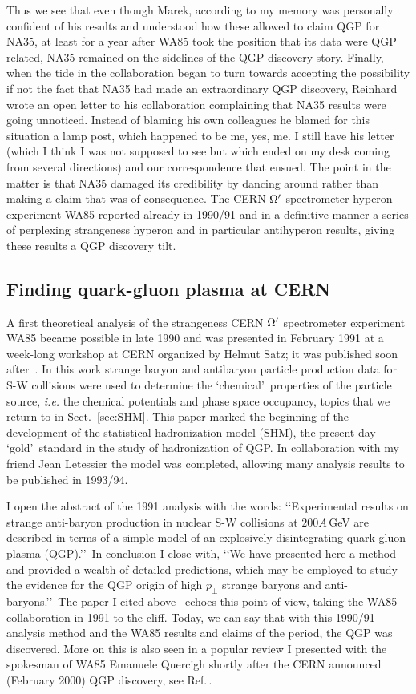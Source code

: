 \documentclass{appolb}
\begin{document}
Thus we see that even though Marek, according to my memory was personally confident of his results and understood how these allowed to claim QGP for NA35, at least for a year after WA85 took the position that its data were QGP related, NA35 remained on the sidelines of the QGP discovery story. Finally, when the tide in the collaboration began to turn towards accepting the possibility if not the fact that NA35 had made an extraordinary QGP discovery, Reinhard wrote an open letter to his collaboration complaining that NA35 results were going unnoticed. Instead of blaming his own colleagues he blamed for this situation a lamp post, which happened to be me, yes, me. I still have his letter (which I think I was not supposed to see but which ended on my desk coming from several directions) and our correspondence that ensued. The point in the matter is that NA35 damaged its credibility by dancing around rather than making a claim that was of consequence. The CERN $\Omega\rq$ spectrometer hyperon experiment WA85 reported already in 1990/91 and in a definitive manner a series of perplexing strangeness hyperon and in particular antihyperon results, giving these results a QGP discovery tilt. 

\subsection{Finding quark-gluon plasma at CERN}\label{ssec:discovery}
A first theoretical analysis of the strangeness CERN $\Omega\rq$ spectrometer experiment WA85 became possible in late 1990 and was presented in February 1991 at a week-long workshop at CERN organized by Helmut Satz; it was published soon after~\cite{Rafelski:1991rh}. In this work strange baryon and antibaryon particle production data for S-W collisions were used to determine the \lq chemical\rq\ properties of the particle source, {\it i.e.} the chemical potentials and phase space occupancy, topics that we return to in Sect.~\ref{sec:SHM}. This paper marked the beginning of the development of the statistical hadronization model (SHM), the present day \lq gold\rq\ standard in the study of hadronization of QGP. In collaboration with my friend Jean Letessier the model was completed, allowing many analysis results to be published in 1993/94.

I open the abstract of the 1991 analysis with the words: \lq\lq Experimental results on strange anti-baryon production in nuclear S-W collisions at $200 A$\,GeV are described in terms of a simple model of an explosively disintegrating quark-gluon plasma (QGP).\rq\rq\ In conclusion I close with, \lq\lq We have presented here a method and provided a wealth of detailed predictions, which may be employed to study the evidence for the QGP origin of high $p_\bot$ strange baryons and anti-baryons.\rq\rq\ The paper I cited above~\cite{Abatzis:1991ju} echoes this point of view, taking the WA85 collaboration in 1991 to the cliff. Today, we can say that with this 1990/91 analysis method and the WA85 results and claims of the period, the QGP was discovered. More on this is also seen in a popular review I presented with the spokesman of WA85 Emanuele Quercigh shortly after the CERN announced (February 2000) QGP discovery, see Ref.\,\cite{QR2000}.
\end{document}
